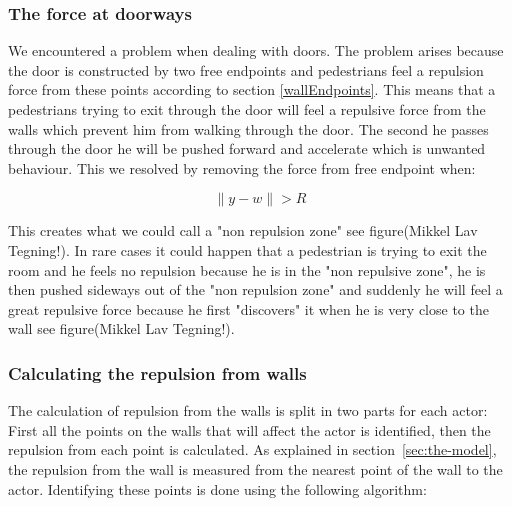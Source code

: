 \subsubsection{The force at doorways}
We encountered a problem when dealing with doors. The problem arises because 
the door is constructed by two free endpoints and pedestrians feel a repulsion 
force from these points according to section \ref{wallEndpoints}. This means 
that a pedestrians trying to exit through the door will feel a repulsive force 
from the walls which prevent him from walking through the door. The second he 
passes through the door he will be pushed forward and accelerate which is unwanted 
behaviour. This we resolved by removing the force from free endpoint when:

\begin{equation}
\| y - w \| > R
\end{equation}

This creates what we could call a "non repulsion zone" see figure(Mikkel Lav Tegning!).
In rare cases it could happen that a pedestrian is trying to exit the room and he feels 
no repulsion because he is in the "non repulsive zone", he is then pushed sideways out 
of the "non repulsion zone" and suddenly he will feel a great repulsive force because 
he first "discovers" it when he is very close to the wall see figure(Mikkel Lav Tegning!).
\subsubsection{Calculating the repulsion from walls}
The calculation of repulsion from the walls is split in two parts for each 
actor: First all the points on the walls that will affect the actor is 
identified, then the repulsion from each point is calculated. As explained in 
section~\ref{sec:the-model}, the repulsion from the wall is measured from the 
nearest point of the wall to the actor. Identifying these points is done using 
the following algorithm:

